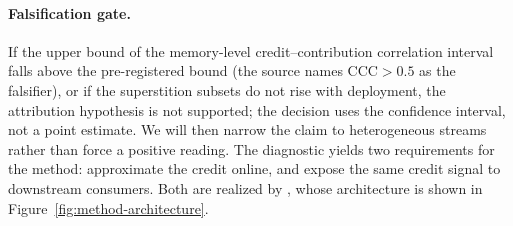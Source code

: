 \paragraph{Falsification gate.}
If the upper bound of the memory-level credit--contribution correlation interval
falls above the pre-registered bound (the source names $\mathrm{CCC} > 0.5$ as the
falsifier), or if the superstition subsets do not rise with deployment, the
attribution hypothesis is not supported; the decision uses the confidence interval,
not a point estimate. We will then narrow the claim to heterogeneous streams rather
than force a positive reading. The diagnostic yields two requirements for the method:
approximate the \rit{} credit online, and expose the same credit signal to
downstream consumers. Both are realized by \method{}, whose architecture is shown in
Figure~\ref{fig:method-architecture}.
